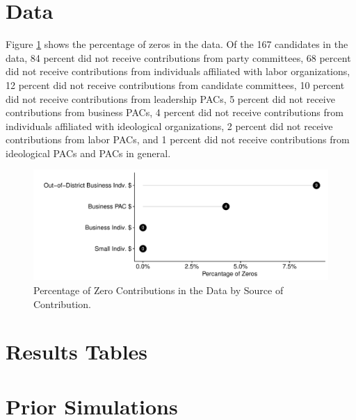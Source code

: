 \documentclass[12pt]{article}
\begin{document}
\begin{appendices}
\doublespacing
\setcounter{table}{0}
\renewcommand{\thetable}{A\arabic{table}}

\section{Data}

Figure \ref{fig: zeros} shows the percentage of zeros in the data. Of the 167 candidates in the data, 84 percent did not receive contributions from party committees, 68 percent did not receive contributions from individuals affiliated with labor organizations, 12 percent did not receive contributions from candidate committees, 10 percent did not receive contributions from leadership PACs, 5 percent did not receive contributions from business PACs,  4 percent did not receive contributions from individuals affiliated with ideological organizations, 2 percent did not receive contributions from labor PACs, and 1 percent did not receive contributions from ideological PACs and PACs in general.  

\begin{figure}[!htb]
    \centering
    \includegraphics[width=0.85\linewidth]{zero_candy.pdf}
    \caption{Percentage of Zero Contributions in the Data by Source of Contribution.}
    \label{fig: zeros}
\end{figure}


\section{Results Tables} \label{sec: reg tables}



\begin{landscape}

\end{landscape}


\section{Prior Simulations} \label{sec: prior sims}


\end{appendices}
\end{document}
